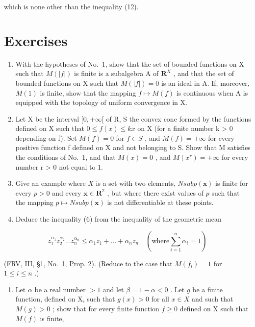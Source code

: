 which is none other than the inequality (12).

\chapter*{Exercises}
{}

\begin{enumerate}
\def\labelenumi{\arabic{enumi})}
\item
  With the hypotheses of No.~1, show that the set of bounded functions on X such that \(M(|f|)\) is finite is a subalgebra A of \(\mathbf{R}^X\) , and that the set of bounded functions on X such that \(M(|f|) = 0\) is an ideal in A. If, moreover, \(M(1)\) is finite, show that the mapping \(f \mapsto M(f)\) is continuous when A is equipped with the topology of uniform convergence in X.
\item
  Let X be the interval \([0, +\infty[\) of R, S the convex cone formed by the functions defined on X such that \(0 \leqslant f(x) \leqslant kx\) on X (for a finite number k \textgreater{} 0 depending on f). Set \(M(f) = 0\) for \(f \in S\) , and \(M(f) = +\infty\) for every positive function f defined on X and not belonging to S. Show that M satisfies the conditions of No.~1, and that \(M(x) = 0\) , and \(M(x^{r}) = +\infty\) for every number r \textgreater{} 0 not equal to 1.
\item
  Give an example where \(X\) is a set with two elements, \(N sub p(\mathbf{x})\) is finite for every \(p > 0\) and every \(\mathbf{x} \in \mathbf{R}^2\) , but where there exist values of \(p\) such that the mapping \(p \mapsto N sub p(\mathbf{x})\) is not differentiable at these points.
\item
  Deduce the inequality (6) from the inequality of the geometric mean
\end{enumerate}

\[
z _ {1} ^ {\alpha_ {1}} z _ {2} ^ {\alpha_ {2}} \dots z _ {n} ^ {\alpha_ {n}} \leqslant \alpha_ {1} z _ {1} + \dots + \alpha_ {n} z _ {n} \quad (\text {where} \sum_ {i = 1} ^ {n} \alpha_ {i} = 1)
\]

(FRV, III, §1, No.~1, Prop. 2). (Reduce to the case that \(M(f_i) = 1\) for \(1 \leqslant i \leqslant n\) .)

\begin{enumerate}
\def\labelenumi{\arabic{enumi})}
\setcounter{enumi}{4}
\tightlist
\item
  Let \(\alpha\) be a real number \(>1\) and let \(\beta = 1 - \alpha < 0\) . Let \(g\) be a finite function, defined on X, such that \(g(x) > 0\) for all \(x \in X\) and such that \(M(g) > 0\) ; show that for every finite function \(f \geqslant 0\) defined on X such that \(M(f)\) is finite,
\end{enumerate}

